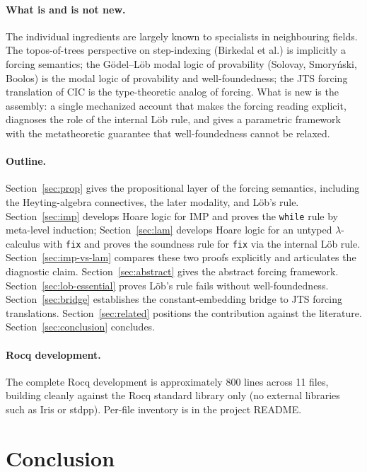 \documentclass[11pt]{article}
\begin{document}
\paragraph{What is and is not new.}
The individual ingredients are largely known to specialists in
neighbouring fields. The topos-of-trees perspective on step-indexing
(Birkedal et al.) is implicitly a forcing semantics; the Gödel--Löb
modal logic of provability (Solovay, Smoryński, Boolos) is the modal
logic of provability and well-foundedness; the JTS forcing
translation of CIC is the type-theoretic analog of forcing. What is
new is the assembly: a single mechanized account that makes the
forcing reading explicit, diagnoses the role of the internal Löb
rule, and gives a parametric framework with the metatheoretic
guarantee that well-foundedness cannot be relaxed.

\paragraph{Outline.}
Section~\ref{sec:prop} gives the propositional layer of the forcing
semantics, including the Heyting-algebra connectives, the later
modality, and Löb's rule. Section~\ref{sec:imp} develops Hoare
logic for IMP and proves the \texttt{while} rule by meta-level
induction; Section~\ref{sec:lam} develops Hoare logic for an untyped
$\lambda$-calculus with \texttt{fix} and proves the soundness rule
for \texttt{fix} via the internal Löb rule. Section~\ref{sec:imp-vs-lam}
compares these two proofs explicitly and articulates the diagnostic
claim. Section~\ref{sec:abstract} gives the abstract forcing
framework. Section~\ref{sec:lob-essential} proves Löb's rule fails
without well-foundedness. Section~\ref{sec:bridge} establishes the
constant-embedding bridge to JTS forcing translations.
Section~\ref{sec:related} positions the contribution against the
literature. Section~\ref{sec:conclusion} concludes.

\paragraph{Rocq development.}
The complete Rocq development is approximately 800 lines across 11
files, building cleanly against the Rocq standard library only (no
external libraries such as Iris or stdpp). Per-file inventory is in
the project README.

\section{Conclusion}
\end{document}
